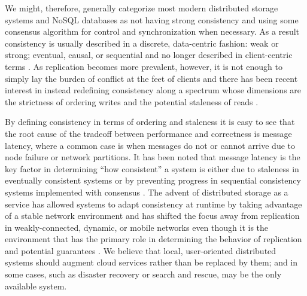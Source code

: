 \documentclass[10pt,conference,compsocconf,letterpaper]{IEEEtran}
\begin{document}
We might, therefore, generally categorize most modern distributed storage systems and NoSQL databases as not having strong consistency and using some consensus algorithm for control and synchronization when necessary. As a result consistency is usually described in a discrete, data-centric fashion: weak or strong; eventual, causal, or sequential and no longer described in client-centric terms \cite{bermbach_consistency_2013}. As replication becomes more prevalent, however, it is not enough to simply lay the burden of conflict at the feet of clients and there has been recent interest in instead redefining consistency along a spectrum whose dimensions are the strictness of ordering writes and the potential staleness of reads \cite{yu_design_2002,li_making_2012,afek_quasi-linearizability:_2010,al-ekram_multi-consistency_2010,krishnamurthy_adaptive_2002}.

By defining consistency in terms of ordering and staleness it is easy to see that the root cause of the tradeoff between performance and correctness is message latency, where a common case is when messages do not or cannot arrive due to node failure or network partitions. It has been noted that message latency is the key factor in determining ``how consistent'' a system is either due to staleness in eventually consistent systems \cite{bailis_probabilistically_2012} or by preventing progress in sequential consistency systems implemented with consensus \cite{howard_raft_2015}. The advent of distributed storage as a service has allowed systems to adapt consistency at runtime by taking advantage of a stable network environment \cite{chihoub_harmony:_2012,chihoub_consistency_2013,kraska_consistency_2009} and has shifted the focus away from replication in weakly-connected, dynamic, or mobile networks even though it is the environment that has the primary role in determining the behavior of replication and potential guarantees \cite{pitoura_data_1999,deno-toc}. We believe that local, user-oriented distributed systems should augment cloud services rather than be replaced by them; and in some cases, such as disaster recovery or search and rescue, may be the only available system.
\end{document}
